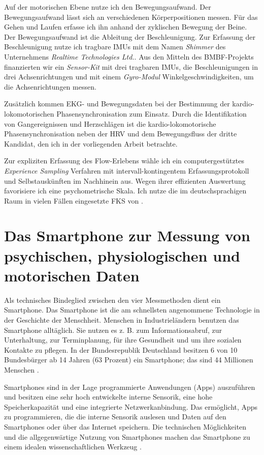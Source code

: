 Auf der motorischen Ebene nutze ich den Bewegungsaufwand. Der Bewegungsaufwand lässt sich an verschiedenen Körperpositionen messen. Für das Gehen und Laufen erfasse ich ihn anhand der zyklischen Bewegung der Beine. Der Bewegungsaufwand ist die Ableitung der Beschleunigung. Zur Erfassung der Beschleunigung nutze ich tragbare \acp{IMU} mit dem Namen \emph{Shimmer} des Unternehmens \emph{Realtime Technologies Ltd.}. Aus den Mitteln des \acs{BMBF}-Projekts finanzierten wir ein \emph{Sensor-Kit} mit drei tragbaren \acp{IMU}, die Beschleunigungen in drei Achsenrichtungen und mit einem \emph{Gyro-Modul} Winkelgeschwindigkeiten, um die Achsenrichtungen messen.

Zusätzlich kommen \ac{EKG}- und Bewegungsdaten bei der Bestimmung der kardio-lokomotorischen Phasensynchronisation zum Einsatz. Durch die Identifikation von Gangereignissen und Herzschlägen ist die kardio-lokomotorische Phasensynchronisation neben der \ac{HRV} und dem Bewegungsfluss der dritte Kandidat, den ich in der vorliegenden Arbeit betrachte.

Zur expliziten Erfassung des Flow-Erlebens wähle ich ein computergestütztes \emph{Experience Sampling} Verfahren mit intervall-kontingentem Erfassungsprotokoll und Selbstauskünften im Nachhinein aus. Wegen ihrer effizienten Auswertung favorisiere ich eine psychometrische Skala. Ich nutze die im deutschsprachigen Raum in vielen Fällen eingesetzte \ac{FKS} von \citet{Rheinberg2003}.

\section{Das Smartphone zur Messung von psychischen, physiologischen und motorischen Daten}
\label{sec:das-smartphone-zur-messung}
Als technisches Bindeglied zwischen den vier Messmethoden dient ein Smartphone. Das Smartphone ist die am schnellsten angenommene Technologie in der Geschichte der Menschheit. Menschen in Industrieländern benutzen das Smartphone alltäglich. Sie nutzen es z. B. zum Informationsabruf, zur Unterhaltung, zur Terminplanung, für ihre Gesundheit und um ihre sozialen Kontakte zu pflegen. In der Bundesrepublik Deutschland besitzen 6 von 10 Bundesbürger ab 14 Jahren (63 Prozent) ein Smartphone; das sind 44 Millionen Menschen \citep[vgl.][]{bitkom2015}.

Smartphones sind in der Lage programmierte Anwendungen (Apps) auszuführen und besitzen eine sehr hoch entwickelte interne Sensorik, eine hohe Speicherkapazität und eine integrierte Netzwerkanbindung. Das ermöglicht, Apps zu programmieren, die die interne Sensorik auslesen und Daten auf den Smartphones oder über das Internet speichern. Die technischen Möglichkeiten und die allgegenwärtige Nutzung von Smartphones machen das Smartphone zu einem idealen wissenschaftlichen Werkzeug \citep[vgl.][]{Raento2009}.

